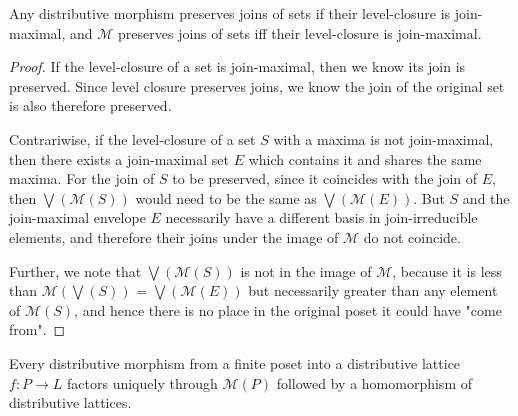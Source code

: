 \documentclass[hoptionsi,review,format=sigplan]{acmart}
\theoremstyle{definition}
\newcommand{\Mcc}{\mathcal{M}}
\begin{document}
\begin{lemma}
Any distributive morphism preserves joins of sets if their level-closure is join-maximal, and \(\Mcc\) preserves joins of sets iff their level-closure is join-maximal.
\end{lemma}
\begin{proof}
If the level-closure of a set is join-maximal, then we know its join is preserved. Since level closure preserves joins, we know the join of the original set is also therefore preserved. 

Contrariwise, if the level-closure of a set \(S\) with a maxima is not join-maximal, then there exists a join-maximal set \(E\) which contains it and shares the same maxima. For the join of \(S\) to be preserved, since it coincides with the join of \(E\), then \(\bigvee(\Mcc(S))\) would need to be the same as \(\bigvee(\Mcc(E))\). But \(S\) and the join-maximal envelope \(E\) necessarily have a different basis in join-irreducible elements, and therefore their joins under the image of \(\Mcc\) do not coincide. 

Further, we note that \(\bigvee(\Mcc(S))\) is not in the image of \(\Mcc\), because it is less than \(\Mcc(\bigvee(S))\) = \(\bigvee(\Mcc(E))\) but necessarily greater than any element of \(\Mcc(S)\), and hence there is no place in the original poset it could have "come from".
\end{proof}




\begin{lemma}
Every distributive morphism from a finite poset into a distributive lattice \(f : P \rightarrow L\) factors uniquely through \(\Mcc(P)\) followed by a homomorphism of distributive lattices.
\end{lemma}
\end{document}
